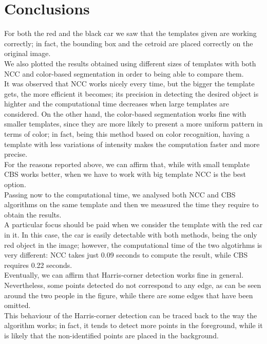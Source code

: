 \section*{Conclusions}
For both the red and the black car we saw that the templates given are working correctly; in fact, the bounding 
box and the cetroid are placed correctly on the original image.\\
We also plotted the results obtained using different sizes of templates with both NCC and color-based segmentation 
in order to being able to compare them.\\
It was observed that NCC works nicely every time, but the bigger the template gets, the more efficient it becomes; its 
precision in detecting the desired object is highter and the computational time decreases when large templates are 
considered. On the other hand, the color-based segmentation works fine with smaller templates, since they are more 
likely to present a more uniform pattern in terms of color; in fact, being this method based on color recognition, 
having a template with less variations of intensity makes the computation faster and more precise.\\
For the reasons reported above, we can affirm that, while with small template CBS works better, when we have to 
work with big template NCC is the best option.\\
Passing now to the computational time, we analysed both NCC and CBS algorithms on the same template and 
then we measured the time they require to obtain the results.\\
A particular focus should be paid when we consider the template with the red car in it. In this case, the car 
is easily detectable with both methods, being the only red object in the image; however, the computational time of the two 
algotirhms is very different: NCC takes just 0.09 seconds to compute the result, while CBS requires 0.22 seconds.\\
Eventually, we can affirm that Harris-corner detection works fine in general. Nevertheless, some points detected 
do not correspond to any edge, as can be seen around the two people in the figure, while there are some edges 
that have been omitted.\\
This behaviour of the Harris-corner detection can be traced back to the way the algorithm works; in fact, it tends to 
detect more points in the foreground, while it is likely that the non-identified points are placed in the background.





